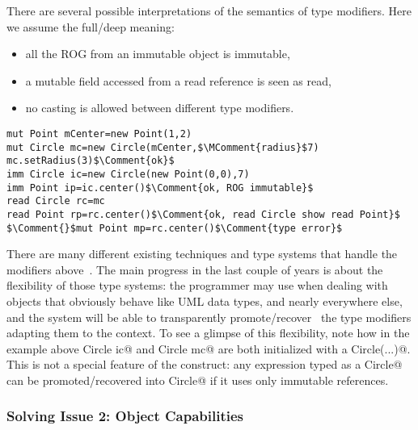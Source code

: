 There are several possible interpretations of the semantics of type modifiers.
Here we assume the full/deep meaning:
\begin{itemize}
\item all the ROG from an immutable object is immutable,
\item a mutable field accessed from a read reference is seen as read,
\item no casting is allowed between different type modifiers.
\end{itemize}
\saveSpace
\begin{lstlisting}
mut Point mCenter=new Point(1,2)
mut Circle mc=new Circle(mCenter,$\MComment{radius}$7)
mc.setRadius(3)$\Comment{ok}$
imm Circle ic=new Circle(new Point(0,0),7)
imm Point ip=ic.center()$\Comment{ok, ROG immutable}$
read Circle rc=mc
read Point rp=rc.center()$\Comment{ok, read Circle show read Point}$
$\Comment{}$mut Point mp=rc.center()$\Comment{type error}$ 
\end{lstlisting}
\saveSpace

There are many different existing techniques and type systems that handle the modifiers above~\cite{ZibinEtAl10,ClarkeWrigstad03,HallerOdersky10,GordonEtAl12,ServettoZucca15}.
The main progress in the last couple of years is about the flexibility of those type systems: the programmer may use \Q@imm@ when dealing with objects that obviously behave like
 UML data types, and \Q@mut@ nearly everywhere else,
 and the system will be able to transparently promote/recover~\cite{GordonEtAl12,clebsch2015deny,ServettoZucca15}
 the type modifiers adapting them to the context.
To see a glimpse of this flexibility, note how in the example above \Q@imm Circle ic@ and
\Q@mut Circle mc@ are both initialized with a \Q@new Circle(...)@.
This is not a special feature of the \Q@new@ construct: any expression typed as a \Q@mut Circle@ can be promoted/recovered into \Q@imm Circle@ if it uses only immutable references.

\saveSpace
\subsubsection*{Solving Issue 2: Object Capabilities}

